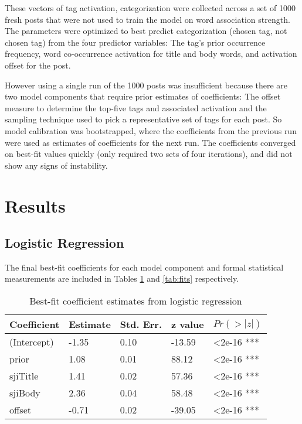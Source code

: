 \documentclass[10pt,letterpaper]{article}
\begin{document}
These vectors of tag activation, categorization were collected across a set of \num{1000} fresh posts that were not used to train the model on word association strength.
The parameters were optimized to best predict categorization (chosen tag, not chosen tag) from the four predictor variables:
The tag's prior occurrence frequency, word co-occurrence activation for title and body words, and activation offset for the post.

However using a single run of the \num{1000} posts was insufficient because there are two model components that require prior estimates of coefficients:
The offset measure to determine the top-five tags and associated activation and the sampling technique used to pick a representative set of tags for each post.
So model calibration was bootstrapped, where the coefficients from the previous run were used as estimates of coefficients for the next run.
The coefficients converged on best-fit values quickly (only required two sets of four iterations), and did not show any signs of instability.

\section{Results}

\subsection{Logistic Regression}

The final best-fit coefficients for each model component and formal statistical measurements are included in Tables \ref{tab:coeffs} and \ref{tab:fits} respectively.

\renewcommand{\arraystretch}{1}
\renewcommand{\tabcolsep}{1mm}
\begin{table}[!ht]
  \begin{center}
    \caption{Best-fit coefficient estimates from logistic regression}
    \label{tab:coeffs}
    \vskip 0.12in
    \begin{tabular}{lllll}
      \hline
      Coefficient & 	Estimate &	Std. Err. &	z value &	$Pr(>|z|)$  \\
      \hline
      (Intercept) &	-1.35 &		0.10 &		-13.59 &	\textless2e-16 *** \\
      prior &		1.08 & 		0.01 &		88.12 & 	\textless2e-16 *** \\
      sjiTitle &	1.41 &		0.02 &		57.36 &		\textless2e-16 *** \\
      sjiBody &		2.36 &		0.04 &		58.48 &		\textless2e-16 *** \\
      offset &		-0.71 &		0.02 &		-39.05 &	\textless2e-16 *** \\
      \hline
    \end{tabular}
  \end{center}
\end{table}
\end{document}
